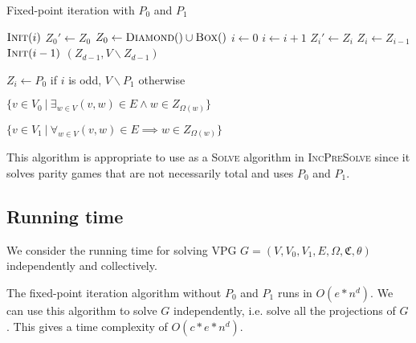 \begin{algorithm}
	\caption{Fixed-point iteration with $P_0$ and $P_1$}
	\label{alg_FPITE}
	\begin{multicols}{2}
		\begin{algorithmic}[1]
					\State $\textsc{Init}(i)$
				\EndFor
				\Repeat
					\State $Z_0'\gets Z_0$
					\State $Z_0 \gets \textsc{Diamond}() \cup \textsc{Box}()$
					\State $i \gets 0$
						\State $i \gets i+1$
						\State $Z_i' \gets Z_i$
						\State $Z_i \gets Z_{i-1}$
						\State $\textsc{Init}(i-1)$
					\EndWhile
				\State \Return $(Z_{d-1},V\backslash Z_{d-1})$
			\EndFunction
		\end{algorithmic}\bigskip\bigskip
		\begin{algorithmic}[1]
			\Function{Init}{$i$}
				\State $Z_i \gets P_0$ if $i$ is odd, $V\backslash P_1$ otherwise
			\EndFunction
		\end{algorithmic}\bigskip
		\begin{algorithmic}[1]
			\Function{Diamond}{}
				\State \Return $\{ v \in V_0\ |\ \exists_{w\in V} (v,w) \in E \wedge w \in Z_{\Omega(w)}\}$
			\EndFunction
		\end{algorithmic}\bigskip
		\begin{algorithmic}[1]
			\Function{Box}{}
			\State \Return $\{ v \in V_1\ |\ \forall_{w\in V} (v,w) \in E \implies w \in Z_{\Omega(w)}\}$
			\EndFunction
		\end{algorithmic}
	\end{multicols}
\end{algorithm}

This algorithm is appropriate to use as a \textsc{Solve} algorithm in \textsc{IncPreSolve} since it solves parity games that are not necessarily total and uses $P_0$ and $P_1$.

\subsection{Running time}
We consider the running time for solving VPG $G = (V,V_0,V_1,E,\Omega,\mathfrak{C},\theta)$ independently and collectively.

The fixed-point iteration algorithm without $P_0$ and $P_1$ runs in $O(e*n^d)$. We can use this algorithm to solve $G$ independently, i.e. solve all the projections of $G$. This gives a time complexity of $O(c*e*n^d)$.

